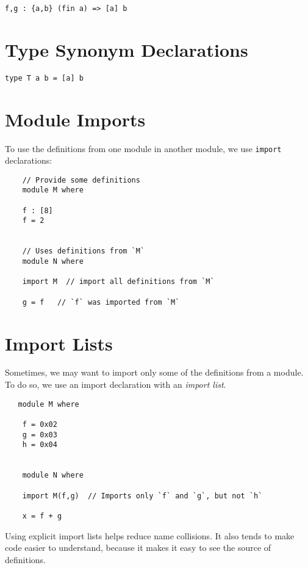 \begin{verbatim}
f,g : {a,b} (fin a) => [a] b
\end{verbatim}

\section{Type Synonym Declarations}\label{type-synonym-declarations}

\begin{verbatim}
type T a b = [a] b
\end{verbatim}

\section{Module Imports}

To use the definitions from one module in another module, we use
\texttt{import} declarations:


\begin{verbatim}
    // Provide some definitions
    module M where

    f : [8]
    f = 2


    // Uses definitions from `M`
    module N where

    import M  // import all definitions from `M`

    g = f   // `f` was imported from `M`
\end{verbatim}

\section{Import Lists}

Sometimes, we may want to import only some of the definitions
from a module.  To do so, we use an import declaration with
an \textit{import list}.


\begin{verbatim}
   module M where

    f = 0x02
    g = 0x03
    h = 0x04


    module N where

    import M(f,g)  // Imports only `f` and `g`, but not `h`

    x = f + g
\end{verbatim}

Using explicit import lists helps reduce name collisions.
It also tends to make code easier to understand,  because
it makes it easy to see the source of definitions.


